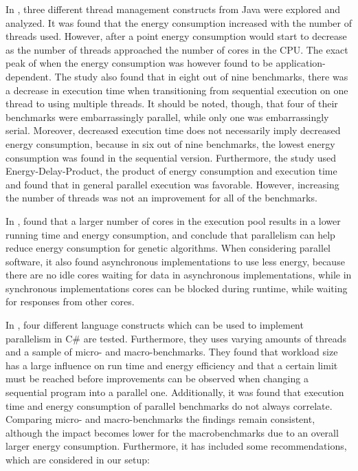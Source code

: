 In \cite{Pinto2014}, three different thread management constructs from Java were explored and analyzed. It was found that the energy consumption increased with the number of threads used. However, after a point energy consumption would start to decrease as the number of threads approached the number of cores in the CPU. The exact peak of when the energy consumption was however found to be application-dependent. The study also found that in eight out of nine benchmarks, there was a decrease in execution time when transitioning from sequential execution on one thread to using multiple threads. It should be noted, though, that four of their benchmarks were embarrassingly parallel, while only one was embarrassingly serial. Moreover, decreased execution time does not necessarily imply decreased energy consumption, because in six out of nine benchmarks, the lowest energy consumption was found in the sequential version. Furthermore, the study used Energy-Delay-Product, the product of energy consumption and execution time and found that in general parallel execution was favorable. However, increasing the number of threads was not an improvement for all of the benchmarks.\cite{Pinto2014}

In \cite{abdelhafez2019}, found that a larger number of cores in the execution pool results in a lower running time and energy consumption, and conclude that parallelism can help reduce energy consumption for genetic algorithms. %
When considering parallel software, it also found asynchronous implementations to use less energy, because there are no idle cores waiting for data in asynchronous implementations, while in synchronous implementations cores can be blocked during runtime, while waiting for responses from other cores.

In \cite{Lindholt2022}, %
four different language constructs which can be used to implement parallelism in C\# are tested. Furthermore, they uses varying amounts of threads and a sample of micro- and macro-benchmarks. They found that workload size has a large influence on run time and energy efficiency and that a certain limit must be reached before improvements can be observed when changing a sequential program into a parallel one. Additionally, it was found that execution time and energy consumption of parallel benchmarks do not always correlate. Comparing micro- and macro-benchmarks the findings remain consistent, although the impact becomes lower for the macrobenchmarks due to an overall larger energy consumption. Furthermore, it has included some recommendations, which are considered in our setup:\cite{Lindholt2022}

